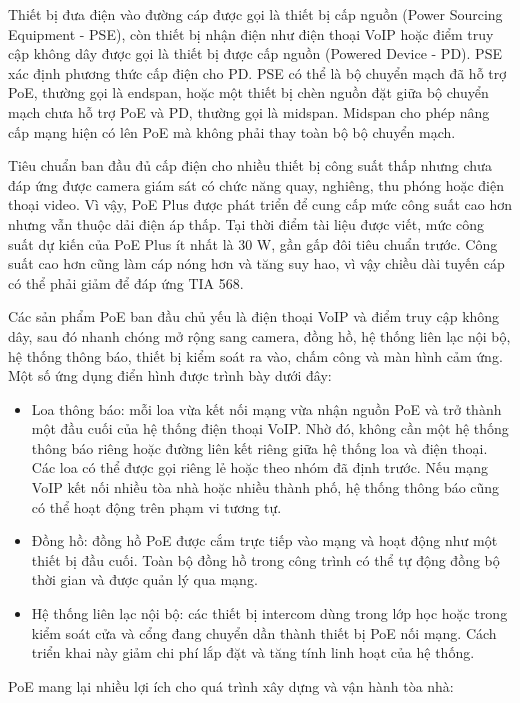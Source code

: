\documentclass{thesis}
\begin{document}
Thiết bị đưa điện vào đường cáp được gọi là thiết bị cấp nguồn (Power
Sourcing Equipment - PSE), còn thiết bị nhận điện như điện thoại VoIP
hoặc điểm truy cập không dây được gọi là thiết bị được cấp nguồn
(Powered Device - PD). PSE xác định phương thức cấp điện cho PD. PSE
có thể là bộ chuyển mạch đã hỗ trợ PoE, thường gọi là endspan, hoặc
một thiết bị chèn nguồn đặt giữa bộ chuyển mạch chưa hỗ trợ PoE và
PD, thường gọi là midspan. Midspan cho phép nâng cấp mạng hiện có lên
PoE mà không phải thay toàn bộ bộ chuyển mạch.

Tiêu chuẩn ban đầu đủ cấp điện cho nhiều thiết bị công suất thấp
nhưng chưa đáp ứng được camera giám sát có chức năng quay, nghiêng,
thu phóng hoặc điện thoại video. Vì vậy, PoE Plus được phát triển để
cung cấp mức công suất cao hơn nhưng vẫn thuộc dải điện áp thấp. Tại
thời điểm tài liệu được viết, mức công suất dự kiến của PoE Plus ít
nhất là 30 W, gần gấp đôi tiêu chuẩn trước. Công suất cao hơn cũng
làm cáp nóng hơn và tăng suy hao, vì vậy chiều dài tuyến cáp có thể
phải giảm để đáp ứng TIA 568.

Các sản phẩm PoE ban đầu chủ yếu là điện thoại VoIP và điểm truy cập
không dây, sau đó nhanh chóng mở rộng sang camera, đồng hồ, hệ thống
liên lạc nội bộ, hệ thống thông báo, thiết bị kiểm soát ra vào, chấm
công và màn hình cảm ứng. Một số ứng dụng điển hình được trình bày dưới đây:

\begin{itemize}
  \item Loa thông báo: mỗi loa vừa kết nối mạng vừa nhận nguồn
    PoE và trở thành một đầu cuối của hệ thống điện thoại VoIP.
    Nhờ đó, không cần một hệ thống thông báo riêng hoặc đường
    liên kết riêng giữa hệ thống loa và điện thoại. Các loa có
    thể được gọi riêng lẻ hoặc theo nhóm đã định trước. Nếu mạng
    VoIP kết nối nhiều tòa nhà hoặc nhiều thành phố, hệ thống
    thông báo cũng có thể hoạt động trên phạm vi tương tự.
  \item Đồng hồ: đồng hồ PoE được cắm trực tiếp vào mạng và hoạt
    động như một thiết bị đầu cuối. Toàn bộ đồng hồ trong công
    trình có thể tự động đồng bộ thời gian và được quản lý qua mạng.
  \item Hệ thống liên lạc nội bộ: các thiết bị intercom dùng
    trong lớp học hoặc trong kiểm soát cửa và cổng đang chuyển
    dần thành thiết bị PoE nối mạng. Cách triển khai này giảm chi
    phí lắp đặt và tăng tính linh hoạt của hệ thống.
\end{itemize}

PoE mang lại nhiều lợi ích cho quá trình xây dựng và vận hành tòa nhà:
\end{document}
